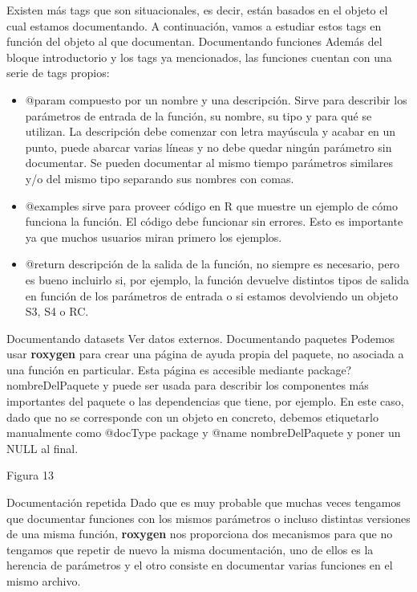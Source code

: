 Existen m\'as tags que son situacionales, es decir, est\'an basados en el objeto el cual estamos
documentando. A continuaci\'on, vamos a estudiar estos tags en funci\'on del objeto al que
documentan.
Documentando funciones
Adem\'as del bloque introductorio y los tags ya mencionados, las funciones cuentan con una
serie de tags propios:
\begin{itemize}
    \item @param compuesto por un nombre y una descripci\'on. Sirve para describir los
par\'ametros de entrada de la funci\'on, su nombre, su tipo y para qu\'e se utilizan.
La descripci\'on debe comenzar con letra may\'uscula y acabar en un punto, puede
abarcar varias l\'ineas y no debe quedar ning\'un par\'ametro sin documentar.
Se pueden documentar al mismo tiempo par\'ametros similares y/o del mismo tipo
separando sus nombres con comas.
    \item @examples sirve para proveer c\'odigo en R que muestre un ejemplo de c\'omo funciona
la funci\'on. El c\'odigo debe funcionar sin errores. Esto es importante ya que muchos
usuarios miran primero los ejemplos.
    \item @return descripci\'on de la salida de la funci\'on, no siempre es necesario, pero es
bueno incluirlo si, por ejemplo, la funci\'on devuelve distintos tipos de salida en funci\'on
de los par\'ametros de entrada o si estamos devolviendo un objeto S3, S4 o RC.
\end{itemize}

Documentando datasets
Ver datos externos.
Documentando paquetes
Podemos usar \textbf{roxygen} para crear una p\'agina de ayuda propia del paquete, no asociada a
una funci\'on en particular. Esta p\'agina es accesible mediante package?nombreDelPaquete y
puede ser usada para describir los componentes m\'as importantes del paquete o las
dependencias que tiene, por ejemplo.
En este caso, dado que no se corresponde con un objeto en concreto, debemos etiquetarlo
manualmente como @docType package y @name nombreDelPaquete y poner un NULL al
final.

Figura 13

Documentaci\'on repetida
Dado que es muy probable que muchas veces tengamos que documentar funciones con los
mismos par\'ametros o incluso distintas versiones de una misma funci\'on, \textbf{roxygen} nos
proporciona dos mecanismos para que no tengamos que repetir de nuevo la misma
documentaci\'on, uno de ellos es la herencia de par\'ametros y el otro consiste en documentar
varias funciones en el mismo archivo.

